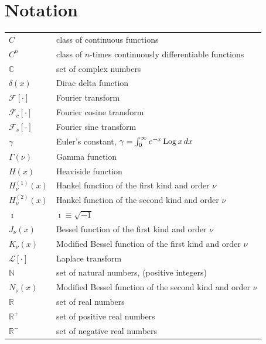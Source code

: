 \raggedbottom
\chapter{Notation}
\raggedbottom 



\setlongtables
\begin{longtable}{ll}
  $C$             & class of continuous functions \\
  $C^n$           & class of $n$-times continuously differentiable functions \\
  $\mathbb{C}$    & set of complex numbers \\
  $\delta(x)$ & Dirac delta function \\
  $\mathcal{F}[\cdot]$       & Fourier transform \\
  $\mathcal{F}_c[\cdot]$     & Fourier cosine transform \\
  $\mathcal{F}_s[\cdot]$     & Fourier sine transform \\
  $\gamma$            & Euler's constant, 
  $\gamma = \int_0^\infty e^{-x} \mathop{\mathrm{Log}}\nolimits x \,d x$ \\
  $\Gamma(\nu)$        & Gamma function \\
  $H(x)$          & Heaviside function \\
  $H_\nu^{(1)}(x)$ & Hankel function of the first kind and order $\nu$ \\
  $H_\nu^{(2)}(x)$ & Hankel function of the second kind and order $\nu$ \\
  $\imath$ & $\imath \equiv \sqrt{-1}$ \\
  $J_\nu(x)$       & Bessel function of the first kind and order $\nu$ \\
  $K_\nu(x)$       & Modified Bessel function of the first kind and order $\nu$ \\
  $\mathcal{L}[\cdot]$       & Laplace transform \\
  $\mathbb{N}$    & set of natural numbers, (positive integers) \\
  $N_\nu(x)$       & Modified Bessel function of the second kind and order $\nu$\\
  $\mathbb{R}$    & set of real numbers \\
  $\mathbb{R}^+$  & set of positive real numbers \\
  $\mathbb{R}^-$  & set of negative real numbers \\

\end{longtable}
